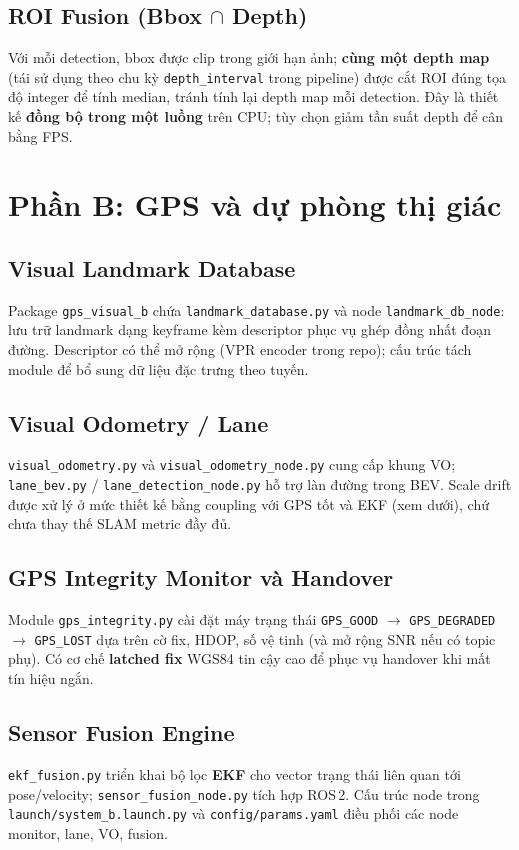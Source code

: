 \documentclass[12pt,a4paper]{article}
\begin{document}
\subsection{ROI Fusion (Bbox $\cap$ Depth)}
Với mỗi detection, bbox được clip trong giới hạn ảnh; \textbf{cùng một depth map} (tái sử dụng theo chu kỳ \texttt{depth\_interval} trong pipeline) được cắt ROI đúng tọa độ integer để tính median, tránh tính lại depth map mỗi detection. Đây là thiết kế \textbf{đồng bộ trong một luồng} trên CPU; tùy chọn giảm tần suất depth để cân bằng FPS.

\section{Phần B: GPS và dự phòng thị giác}

\subsection{Visual Landmark Database}
Package \texttt{gps\_visual\_b} chứa \texttt{landmark\_database.py} và node \texttt{landmark\_db\_node}: lưu trữ landmark dạng keyframe kèm descriptor phục vụ ghép đồng nhất đoạn đường. Descriptor có thể mở rộng (VPR encoder trong repo); cấu trúc tách module để bổ sung dữ liệu đặc trưng theo tuyến.

\subsection{Visual Odometry / Lane}
\texttt{visual\_odometry.py} và \texttt{visual\_odometry\_node.py} cung cấp khung VO; \texttt{lane\_bev.py} / \texttt{lane\_detection\_node.py} hỗ trợ làn đường trong BEV. Scale drift được xử lý ở mức thiết kế bằng coupling với GPS tốt và EKF (xem dưới), chứ chưa thay thế SLAM metric đầy đủ.

\subsection{GPS Integrity Monitor và Handover}
Module \texttt{gps\_integrity.py} cài đặt máy trạng thái \texttt{GPS\_GOOD} $\rightarrow$ \texttt{GPS\_DEGRADED} $\rightarrow$ \texttt{GPS\_LOST} dựa trên cờ fix, HDOP, số vệ tinh (và mở rộng SNR nếu có topic phụ). Có cơ chế \textbf{latched fix} WGS84 tin cậy cao để phục vụ handover khi mất tín hiệu ngắn.

\subsection{Sensor Fusion Engine}
\texttt{ekf\_fusion.py} triển khai bộ lọc \textbf{EKF} cho vector trạng thái liên quan tới pose/velocity; \texttt{sensor\_fusion\_node.py} tích hợp ROS\,2. Cấu trúc node trong \texttt{launch/system\_b.launch.py} và \texttt{config/params.yaml} điều phối các node monitor, lane, VO, fusion.
\end{document}
